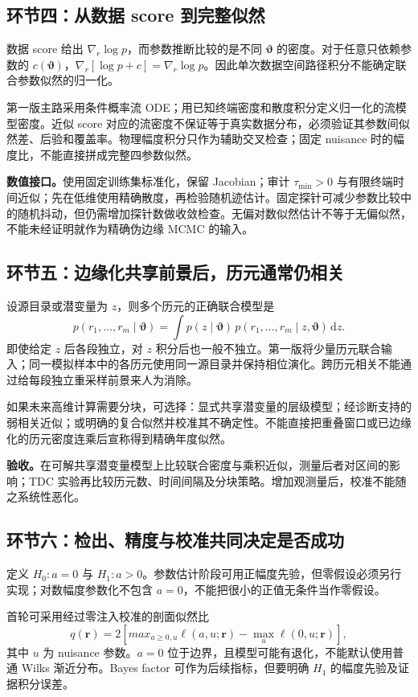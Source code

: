 \documentclass[UTF8,fontset=fandol,a4paper,11pt]{ctexart}
\numberwithin{equation}{section}
\newcommand{\dd}{\mathrm d}
\newcommand{\btheta}{\boldsymbol\vartheta}
\newcommand{\br}{\boldsymbol r}
\begin{document}
\subsection{环节四：从数据 score 到完整似然}
数据 score 给出 $\nabla_r\log p$，而参数推断比较的是不同 $\btheta$ 的密度。对于任意只依赖参数的 $c(\btheta)$，$\nabla_r[\log p+c]=\nabla_r\log p$。因此单次数据空间路径积分不能确定联合参数似然的归一化。

第一版主路采用条件概率流 ODE；用已知终端密度和散度积分定义归一化的流模型密度。近似 score 对应的流密度不保证等于真实数据分布，必须验证其参数间似然差、后验和覆盖率。物理幅度积分只作为辅助交叉检查；固定 nuisance 时的幅度比，不能直接拼成完整四参数似然。

\textbf{数值接口。}使用固定训练集标准化，保留 Jacobian；审计 $\tau_{\min}>0$ 与有限终端时间近似；先在低维使用精确散度，再检验随机迹估计。固定探针可减少参数比较中的随机抖动，但仍需增加探针数做收敛检查。无偏对数似然估计不等于无偏似然，不能未经证明就作为精确伪边缘 MCMC 的输入。

\subsection{环节五：边缘化共享前景后，历元通常仍相关}
设源目录或潜变量为 $z$，则多个历元的正确联合模型是
\begin{equation}
p(r_1,\ldots,r_m\mid\btheta)=
\int p(z\mid\btheta)\,p(r_1,\ldots,r_m\mid z,\btheta)\,\dd z.
\end{equation}
即使给定 $z$ 后各段独立，对 $z$ 积分后也一般不独立。第一版将少量历元联合输入；同一模拟样本中的各历元使用同一源目录并保持相位演化。跨历元相关不能通过给每段独立重采样前景来人为消除。

如果未来高维计算需要分块，可选择：显式共享潜变量的层级模型；经诊断支持的弱相关近似；或明确的复合似然并校准其不确定性。不能直接把重叠窗口或已边缘化的历元密度连乘后宣称得到精确年度似然。

\textbf{验收。}在可解共享潜变量模型上比较联合密度与乘积近似，测量后者对区间的影响；TDC 实验再比较历元数、时间间隔及分块策略。增加观测量后，校准不能随之系统性恶化。

\subsection{环节六：检出、精度与校准共同决定是否成功}
定义 $H_0:a=0$ 与 $H_1:a>0$。参数估计阶段可用正幅度先验，但零假设必须另行实现；对数幅度参数化不包含 $a=0$，不能把很小的正值无条件当作零假设。

首轮可采用经过零注入校准的剖面似然比
\begin{equation}
q(\br)=2\left[max_{a\geq0,u}\ell(a,u;\br)-\max_u\ell(0,u;\br)\right],
\end{equation}
其中 $u$ 为 nuisance 参数。$a=0$ 位于边界，且模型可能有退化，不能默认使用普通 Wilks 渐近分布。Bayes factor 可作为后续指标，但要明确 $H_1$ 的幅度先验及证据积分误差。
\end{document}
